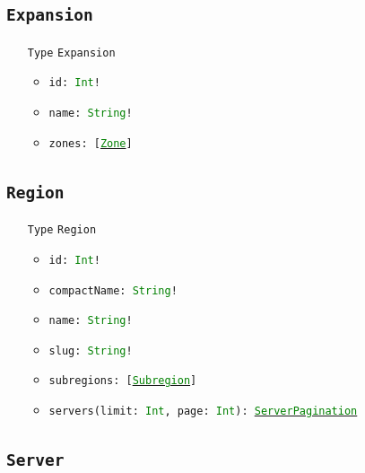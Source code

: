 \documentclass[10pt, a4paper]{memoir}
\numberwithin{equation}{section}
\theoremstyle{plain}
\theoremstyle{defp}
\theoremstyle{dotless}
\theoremstyle{definition}
\theoremstyle{dotless}
\theoremstyle{dotless}
\theoremstyle{defp}
\theoremstyle{defp}
\theoremstyle{be}          %
\theoremstyle{defp}
\newcommand\ttt[1]{\texttt{#1}}
\newcommand\type[1]{\ttt{\textcolor{green}{#1}}}
\begin{document}
\subsection{\ttt{Expansion}}\label{sec:Expansion}

\begin{itemize}[noitemsep,topsep=1pt]
\item[\ttt{Type}] \ttt{Expansion}
\begin{itemize}[itemsep=1pt,topsep=1pt]
\item \ttt{id: \type{Int}!}
\item \ttt{name: \type{String}!}
\item \ttt{zones: [\hyperref[sec:Zone]{\type{Zone}}]}
\end{itemize}
\end{itemize}
\subsection{\ttt{Region}}\label{sec:Region}

\begin{itemize}[noitemsep,topsep=1pt]
\item[\ttt{Type}] \ttt{Region}
\begin{itemize}[itemsep=1pt,topsep=1pt]
\item \ttt{id: \type{Int}!}
\item \ttt{compactName: \type{String}!}
\item \ttt{name: \type{String}!}
\item \ttt{slug: \type{String}!}
\item \ttt{subregions: [\hyperref[sec:Subregion]{\type{Subregion}}]}
\item \ttt{servers(limit: \type{Int}, page: \type{Int}): \hyperref[sec:serverpagination]{\type{ServerPagination}}}
\end{itemize}
\end{itemize}

\subsection{\ttt{Server}}\label{sec:Server}

\end{document}
